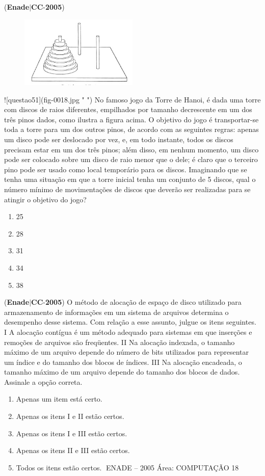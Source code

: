 \documentclass{exam}
\begin{document}
\begin{questions}
\question (\textbf{Enade}$|$\textbf{CC}-\textbf{2005}) \begin{figure}[H]
	\begin{center}
		\includegraphics[width=0.5\textwidth]{CIENCIA_DA_COMPUTACAO_Prova2005-utf8_figuras/fig-0018.jpg}
		\caption{ }
	\end{center}
\end{figure}
![questao51](fig-0018.jpg " ")
No famoso jogo da Torre de Hanoi, é dada uma torre
com discos de raios diferentes, empilhados por tamanho
decrescente em um dos três pinos dados, como ilustra a figura
acima. O objetivo do jogo é transportar-se toda a torre para
um dos outros pinos, de acordo com as seguintes regras:
apenas um disco pode ser deslocado por vez, e, em todo
instante, todos os discos precisam estar em um dos três pinos;
além disso, em nenhum momento, um disco pode ser colocado
sobre um disco de raio menor que o dele; é claro que o
terceiro pino pode ser usado como local temporário para os
discos.
Imaginando que se tenha uma situação em que a torre inicial tenha
um conjunto de 5 discos, qual o número mínimo de movimentações
de discos que deverão ser realizadas para se atingir o objetivo do
jogo?
	\begin{enumerate}[label=\alph*)]
		\item  25
		\item  28
		\item  31
		\item  34
		\item  38

	\end{enumerate}

\question (\textbf{Enade}$|$\textbf{CC}-\textbf{2005}) O método de alocação de espaço de disco utilizado para
armazenamento de informações em um sistema de arquivos
determina o desempenho desse sistema. Com relação a esse assunto,
julgue os itens seguintes.
I A alocação contígua é um método adequado para sistemas em
que inserções e remoções de arquivos são freqüentes.
II Na alocação indexada, o tamanho máximo de um arquivo
depende do número de bits utilizados para representar um índice
e do tamanho dos blocos de índices.
III Na alocação encadeada, o tamanho máximo de um arquivo
depende do tamanho dos blocos de dados.
Assinale a opção correta.
	\begin{enumerate}[label=\alph*)]
		\item  Apenas um item está certo.
		\item  Apenas os itens I e II estão certos.
		\item  Apenas os itens I e III estão certos.
		\item  Apenas os itens II e III estão certos.
		\item  Todos os itens estão certos.
ENADE – 2005 Área: COMPUTAÇÃO 18


\end{enumerate}
\end{questions}
\end{document}
